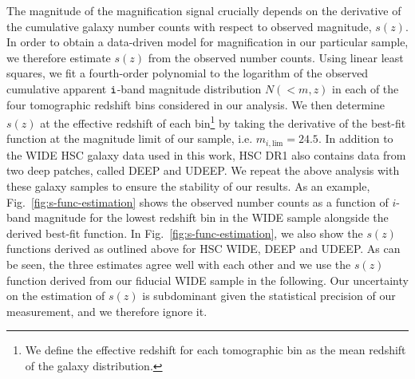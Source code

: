 \documentclass[a4paper,11pt]{article}
\begin{document}
    The magnitude of the magnification signal crucially depends on the derivative of the cumulative galaxy number counts with respect to observed magnitude, $s(z)$. In order to obtain a data-driven model for magnification in our particular sample, we therefore estimate $s(z)$ from the observed number counts. Using linear least squares, we fit a fourth-order polynomial to the logarithm of the observed cumulative apparent $\tt{i}$-band magnitude distribution $N(<m, z)$ in each of the four tomographic redshift bins considered in our analysis. We then determine $s(z)$ at the effective redshift of each bin\footnote{We define the effective redshift for each tomographic bin as the mean redshift of the galaxy distribution.} by taking the derivative of the best-fit function at the magnitude limit of our sample, i.e. $m_{i, \mathrm{lim}} = 24.5$. In addition to the WIDE HSC galaxy data used in this work, HSC DR1 also contains data from two deep patches, called DEEP and UDEEP. We repeat the above analysis with these galaxy samples to ensure the stability of our results. As an example, Fig.~\ref{fig:s-func-estimation} shows the observed number counts as a function of $i$-band magnitude for the lowest redshift bin in the WIDE sample alongside the derived best-fit function. In Fig.~\ref{fig:s-func-estimation}, we also show the $s(z)$ functions derived as outlined above for HSC WIDE, DEEP and UDEEP. As can be seen, the three estimates agree well with each other and we use the $s(z)$ function derived from our fiducial WIDE sample in the following. Our uncertainty on the estimation of $s(z)$ is subdominant given the statistical precision of our measurement, and we therefore ignore it.
\end{document}
